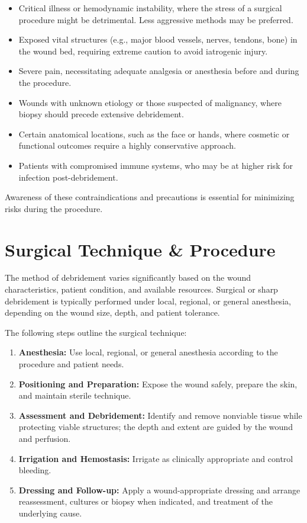 \begin{itemize}
  \item Critical illness or hemodynamic instability, where the stress of a surgical procedure might be detrimental. Less aggressive methods may be preferred.
  \item Exposed vital structures (e.g., major blood vessels, nerves, tendons, bone) in the wound bed, requiring extreme caution to avoid iatrogenic injury.
  \item Severe pain, necessitating adequate analgesia or anesthesia before and during the procedure.
  \item Wounds with unknown etiology or those suspected of malignancy, where biopsy should precede extensive debridement.
  \item Certain anatomical locations, such as the face or hands, where cosmetic or functional outcomes require a highly conservative approach.
  \item Patients with compromised immune systems, who may be at higher risk for infection post-debridement.
\end{itemize}

Awareness of these contraindications and precautions is essential for minimizing risks during the procedure.

\section*{Surgical Technique \& Procedure}
The method of debridement varies significantly based on the wound characteristics, patient condition, and available resources. Surgical or sharp debridement is typically performed under local, regional, or general anesthesia, depending on the wound size, depth, and patient tolerance. 

The following steps outline the surgical technique:
\begin{enumerate}
  \item \textbf{Anesthesia:} Use local, regional, or general anesthesia according to the procedure and patient needs.
  \item \textbf{Positioning and Preparation:} Expose the wound safely, prepare the skin, and maintain sterile technique.
  \item \textbf{Assessment and Debridement:} Identify and remove nonviable tissue while protecting viable structures; the depth and extent are guided by the wound and perfusion.
  \item \textbf{Irrigation and Hemostasis:} Irrigate as clinically appropriate and control bleeding.
  \item \textbf{Dressing and Follow-up:} Apply a wound-appropriate dressing and arrange reassessment, cultures or biopsy when indicated, and treatment of the underlying cause.
\end{enumerate}

